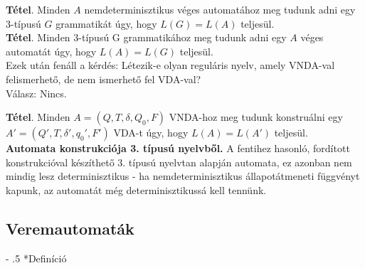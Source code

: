\documentclass[12pt,margin=0px]{article}
\makeatletter
\renewcommand\paragraph{%
	\@startsection{paragraph}{4}{0mm}%
	{-\baselineskip}%
	{.5\baselineskip}%
	{\normalfont\normalsize\bfseries}}
\makeatother
\begin{document}
    \noindent \textbf{Tétel}. Minden $A$ nemdeterminisztikus véges automatához meg tudunk adni egy 3-típusú $G$ grammatikát úgy, hogy $L(G) = L(A)$ teljesül.\\
			      						
    \noindent \textbf{Tétel}. Minden 3-típusú G grammatikához meg tudunk adni egy $A$ véges automatát úgy, hogy $L(A) = L(G)$ teljesül.\\
			      						
    \noindent Ezek után fenáll a kérdés: Létezik-e olyan reguláris nyelv, amely VNDA-val felismerhető, de nem ismerhető fel VDA-val? \\
    \noindent Válasz: Nincs.
			      						
    \noindent \textbf{Tétel}. Minden $A = (Q, T, \delta,Q_0, F)$ VNDA-hoz  meg tudunk konstruálni egy $A' = (Q', T, \delta', q_0', F')$ VDA-t úgy, hogy $L(A) = L(A')$ teljesül.\\

    \noindent \textbf{Automata konstrukciója 3. típusú nyelvből.} A fentihez hasonló, fordított konstrukcióval készíthető 3. típusú nyelvtan alapján automata, ez azonban nem mindig lesz determinisztikus - ha nemdeterminisztikus állapotátmeneti függvényt kapunk, az automatát még determinisztikussá kell tennünk.\\

	\subsection*{Veremautomaták}

	\paragraph*{Definíció}
\end{document}
